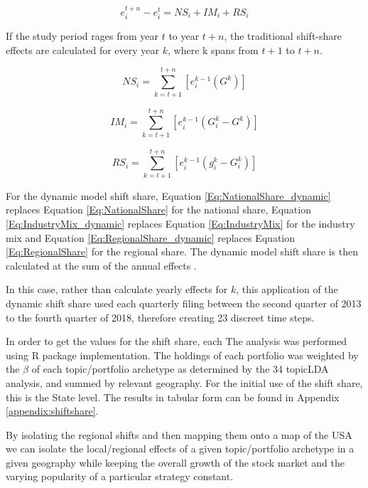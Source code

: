 \begin{equation}
    e^{t+n}_{i} - e^{t}_{i} = NS_{i} + IM_{i} + RS_{i}
\end{equation}

If the study period rages from year $t$ to year $t+n$, the traditional shift-share effects are calculated for every year $k$, where k spans from $t+1$ to $t+n$. 

\begin{equation}
    NS_{i} = \sum_{k=t+1}^{t+n}[e^{k-1}_{i}(G^{k})]
    \label{Eq:NationalShare_dynamic}
\end{equation}

\begin{equation}
    IM_{i} = \sum_{k=t+1}^{t+n}[e^{k-1}_i(G^{k}_{i}-G^{k})]
     \label{Eq:IndustryMix_dynamic}
\end{equation}

\begin{equation}
    RS_{i} = \sum_{k=t+1}^{t+n}[e^{k-1}_i(g^{k}_{i} - G^{k}_{i} )]
        \label{Eq:RegionalShare_dynamic}
\end{equation}

For the dynamic model shift share, Equation \ref{Eq:NationalShare_dynamic} replaces Equation \ref{Eq:NationalShare} for the national share, Equation \ref{Eq:IndustryMix_dynamic} replaces Equation \ref{Eq:IndustryMix}  for the industry mix and Equation \ref{Eq:RegionalShare_dynamic} replaces Equation \ref{Eq:RegionalShare} for the regional share.  The dynamic model shift share is then calculated at the sum of the annual effects \citep{BarffKnight88}.  

In this case, rather than calculate yearly effects for $k$, this application of the dynamic shift share used each quarterly filing between the second quarter of 2013 to the fourth quarter of 2018, therefore creating 23 discreet time steps.

In order to get the values for the shift share, each 
The analysis was performed using \cite{Soudis2019} R package implementation. The holdings of each portfolio was weighted by the $\beta$ of each topic/portfolio archetype as determined by the 34 topicLDA analysis, and summed by relevant geography.  For the initial use of the shift share, this is the State level. The results in tabular form can be found in Appendix \ref{appendix:shiftshare}.

By isolating the regional shifts and then mapping them onto a map of the USA we can isolate the local/regional effects of a given topic/portfolio archetype in a given geography while keeping the overall growth of the stock market and the varying popularity of a particular strategy constant. 

